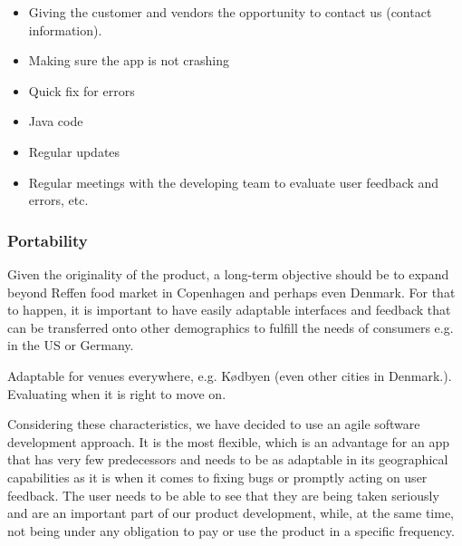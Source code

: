 \begin{itemize}
\item Giving the customer and vendors the opportunity to contact us (contact information).
\item Making sure the app is not crashing
\item Quick fix for errors
\item Java code
\item Regular updates
\item Regular meetings with the developing team to evaluate user feedback and errors, etc.
\end{itemize}


\subsubsection{Portability}

Given the originality of the product, a long-term objective should be to expand beyond Reffen food market in Copenhagen and perhaps even Denmark. For that to happen, it is important to have easily adaptable interfaces and feedback that can be transferred onto other demographics to fulfill the needs of consumers e.g. in the US or Germany.

Adaptable for venues everywhere, e.g. Kødbyen (even other cities in Denmark.).
Evaluating when it is right to move on.


Considering these characteristics, we have decided to use an agile software development approach. It is the most flexible, which is an advantage for an app that has very few predecessors and needs to be as adaptable in its geographical capabilities as it is when it comes to fixing bugs or promptly acting on user feedback. The user needs to be able to see that they are being taken seriously and are an important part of our product development, while, at the same time, not being under any obligation to pay or use the product in a specific frequency.
